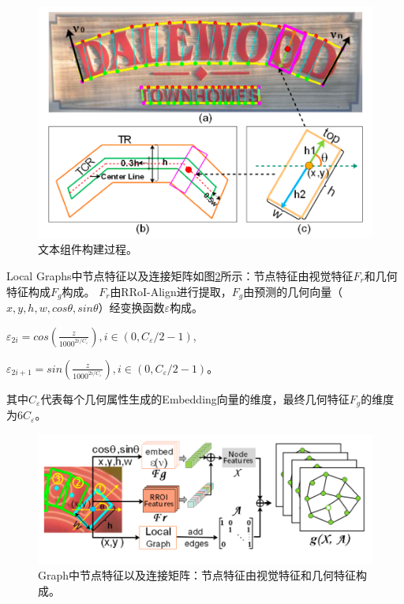 \begin{figure}[H]
    \centering
    \includegraphics[width=.6\textwidth]{figure/detection/drrg_gt.png} 
    \caption{文本组件构建过程。} 
    \label{drrg_gt} 
\end{figure}

Local Graphs中节点特征以及连接矩阵如图\ref{drrg_graph}所示：节点特征由视觉特征$F_{r}$和几何特征构成$F_{g}$构成。
$F_{r}$由RRoI-Align进行提取，$F_{g}$由预测的几何向量（$x,y,h,w,cos\theta,sin\theta$）经变换函数$\varepsilon$构成。

$\varepsilon_{2i} = cos(\frac{z}{1000^{2i/C_{\varepsilon}}}) , i \in (0, C_{\varepsilon}/2-1)$,

$\varepsilon_{2i+1} = sin(\frac{z}{1000^{2i/C_{\varepsilon}}}) , i \in (0, C_{\varepsilon}/2-1)$。

其中$C_{\varepsilon}$代表每个几何属性生成的Embedding向量的维度，最终几何特征$F_{g}$的维度为$6C_{\varepsilon}$。
\begin{figure}[H]
    \centering
    \includegraphics[width=.9\textwidth]{figure/detection/drrg_graph.png} 
    \caption{Graph中节点特征以及连接矩阵：节点特征由视觉特征和几何特征构成。} 
    \label{drrg_graph} 
\end{figure}
